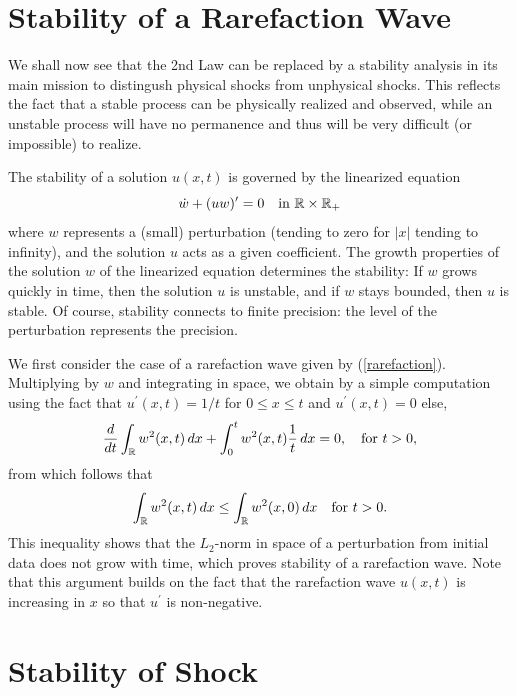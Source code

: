 \section{Stability of a Rarefaction Wave}

We shall now see that the 2nd Law can be replaced by a stability analysis
in its main mission to distingush physical shocks from unphysical shocks.
This reflects the fact that a stable process can be physically realized 
and observed, while an unstable process will have no permanence and
thus will be very difficult (or impossible) to realize.

The stability of a solution $u(x,t)$ is governed 
by the linearized equation 
\begin{equation}\label{linburgers}
\dot w+(uw)^\prime =0\quad\mbox{in }{\mathbb{R}}\times{\mathbb{R}}_+
\end{equation}
where $w$ represents a (small) perturbation (tending to zero for $\vert x\vert$
tending to infinity), and the solution $u$ acts as a 
given coefficient. The growth properties of the solution
$w$ of the linearized equation determines the stability:
If $w$ grows quickly in time, then the solution $u$ is unstable,
and if $w$ stays bounded, then $u$ is stable. Of course, stability
connects to finite precision: the level of the perturbation 
represents the precision.

We first consider the case of
a rarefaction wave given by (\ref{rarefaction}). Multiplying by $w$ and
integrating in space, we obtain by a simple computation using the fact
that $u^\prime (x,t)=1/t$ for $0\le x\le t$ and $u^\prime (x,t)=0$ else,
\[
\frac{d}{dt}\int_{\mathbb{R}} w^2(x,t)\, dx+
\int_0^t w^2(x,t)\frac{1}{t}\, dx =0,\quad\mbox{for }t>0,
\]
from which follows that
\begin{equation}\label{stabrarefaction}
\int_{\mathbb{R}} w^2(x,t)\, dx\le \int_{\mathbb{R}} w^2(x,0)\, dx\quad\mbox{for }t>0.
\end{equation}
This inequality shows that the $L_2$-norm in space
of a perturbation from initial data does not grow with time, 
which proves stability 
of a rarefaction wave. Note that this
argument builds on the fact that the rarefaction wave $u(x,t)$ is increasing in $x$ so that $u^\prime$ is
non-negative.

\section{Stability of Shock}

